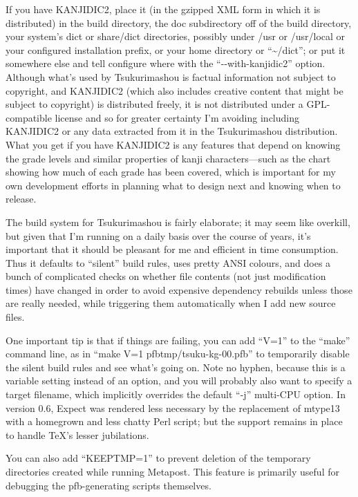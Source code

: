 \documentclass[14pt]{extarticle}
\begin{document}
If you have KANJIDIC2, place it (in the gzipped XML form in which it is
distributed) in the build directory, the doc subdirectory off of the build
directory, your system's dict or share/dict directories, possibly under
/usr or /usr/local or your configured installation prefix, or your home
directory or ``\textasciitilde/dict''; or put it
somewhere else and tell configure where with the ``-{}-with-kanjidic2''
option.  Although what's used by Tsukurimashou is factual information not
subject to copyright, and KANJIDIC2 (which also includes creative content
that might be subject to copyright) is distributed freely, it is not
distributed under a GPL-compatible license and so for greater certainty I'm
avoiding including KANJIDIC2 or any data extracted from it in the
Tsukurimashou distribution.  What you get if you have KANJIDIC2 is any
features that depend on knowing the grade levels and similar properties of
kanji characters---such as the chart showing how much of each grade has been
covered, which is important for my own development efforts in planning what
to design next and knowing when to release.

The build system for Tsukurimashou is fairly elaborate; it may seem like
overkill, but given that I'm running on a daily basis over the course of
years, it's important that it should be pleasant for me and efficient in
time consumption.  Thus it defaults to ``silent'' build rules, uses pretty
ANSI colours, and does a bunch of complicated checks on whether file
contents (not just modification times) have changed in order to avoid
expensive dependency rebuilds unless those are really needed, while
triggering them automatically when I add new source files.

One important tip is that if things are failing, you can add ``V=1'' to the
``make'' command line, as in ``make V=1 pfbtmp/tsuku-kg-00.pfb'' to
temporarily disable the silent build rules and see what's going on.  Note no
hyphen, because this is a variable setting instead of an option, and you
will probably also want to specify a target filename, which implicitly
overrides the default ``-j'' multi-CPU option.  In version 0.6, Expect was
rendered less necessary by the replacement of mtype13 with a homegrown and
less chatty Perl script; but the support remains in place to handle \TeX's
lesser jubilations.

You can also add ``KEEPTMP=1'' to prevent deletion of the temporary
directories created while running Metapost.  This feature is primarily
useful for debugging the pfb-generating scripts themselves.
\end{document}
